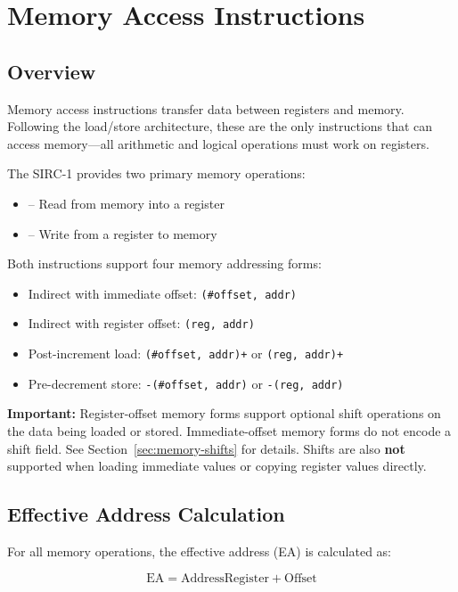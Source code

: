 \chapter{Memory Access Instructions}
\label{ch:memory-instructions}

\section{Overview}

Memory access instructions transfer data between registers and memory. Following the load/store architecture, these are
the only instructions that can access memory—all arithmetic and logical operations must work on registers.

The SIRC-1 provides two primary memory operations:
\begin{itemize}
	\item {} -- Read from memory into a register
	\item {} -- Write from a register to memory
\end{itemize}

Both instructions support four memory addressing forms:
\begin{itemize}
	\item Indirect with immediate offset: \texttt{(\#offset, addr)}
	\item Indirect with register offset: \texttt{(reg, addr)}
	\item Post-increment load: \texttt{(\#offset, addr)+} or \texttt{(reg, addr)+}
	\item Pre-decrement store: \texttt{-(\#offset, addr)} or \texttt{-(reg, addr)}
\end{itemize}

\textbf{Important:} Register-offset memory forms support optional shift operations on the data being loaded or stored.
Immediate-offset memory forms do not encode a shift field. See Section~\ref{sec:memory-shifts} for details. Shifts are
also \textbf{not} supported when loading immediate values or copying register values directly.

\section{Effective Address Calculation}

For all memory operations, the effective address (EA) is calculated as:

\begin{equation}
	\text{EA} = \text{AddressRegister} + \text{Offset}
\end{equation}

